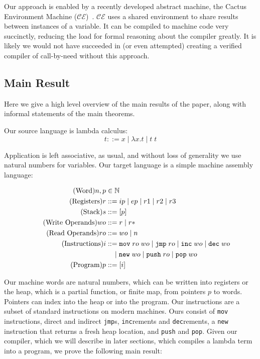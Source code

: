 Our approach is enabled by a recently developed abstract machine, the Cactus
Environment Machine ($\mathcal{CE}$)~\cite{?}. $\mathcal{CE}$ uses a shared
environment to share results between instances of a variable. It can be compiled
to machine code very succinctly, reducing the load for formal reasoning about
the compiler greatly. It is likely we would not have succeeded in (or even
attempted) creating a verified compiler of call-by-need without this approach.

\subsection{Main Result}
Here we give a high level overview of the main results of the paper, along with
informal statements of the main theorems.

Our source language is lambda calculus: 
$$ t ::= x \; | \; \lambda x.t \; | \; t \; t $$

Application is left associative, as usual, and without loss of generality we
use natural numbers for variables. Our target language is a simple machine
assembly language:

\begin{align}
  \tag{Word}   n, p &\in \mathbb{N} \\
  \tag{Registers} r &::= ip \; | \; ep \; | \; r1 \; | \; r2 \; | \; r3 \\
  \tag{Stack}     s &::= [p] \\
  \tag{Write Operands}  wo &::= r \; | \; r* \\
  \tag{Read Operands}  ro &::= wo \; | \; n \\
  \tag{Instructions} i &::= \texttt{mov} \; ro \; wo \; 
                       | \; \texttt{jmp} \; ro \; 
                       | \; \texttt{inc} \; wo \;
                       | \; \texttt{dec} \; wo \; \\
  \notag    & \quad \; | \; \texttt{new} \; wo \;
                       | \; \texttt{push} \; ro \; 
                       | \; \texttt{pop} \; wo \\
  \tag{Program}   p &::= [i]
\end{align}

Our machine words are natural numbers, which can be written into registers or
the heap, which is a partial function, or finite map, from pointers $p$ to
words. Pointers can index into the heap or into the program. Our instructions
are a subset of standard instructions on modern machines. Ours consist of
\texttt{mov} instructions, direct and indirect \texttt{jmp}s, \texttt{inc}rements
and \texttt{dec}rements, a \texttt{new} instruction that returns a fresh heap
location, and \texttt{push} and \texttt{pop}.  Given our compiler, which we will
describe in later sections, which compiles a lambda term into a program, we
prove the following main result:

